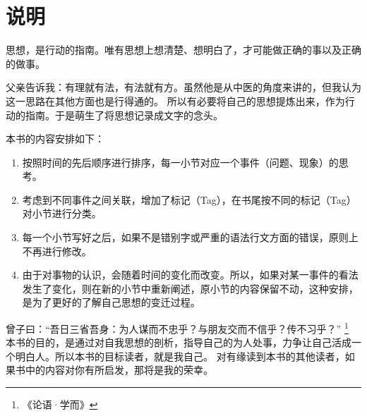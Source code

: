 \chapter{说明}

思想，是行动的指南。唯有思想上想清楚、想明白了，才可能做正确的事以及正确的做事。

父亲告诉我：有理就有法，有法就有方。虽然他是从中医的角度来讲的，但我认为这一思路在其他方面也是行得通的。
所以有必要将自己的思想提炼出来，作为行动的指南。于是萌生了将思想记录成文字的念头。

本书的内容安排如下：

\begin{enumerate}[(1), nosep, left=\parindent]
    \item 按照时间的先后顺序进行排序，每一小节对应一个事件（问题、现象）的思考。

    \item 考虑到不同事件之间关联，增加了标记（Tag），在书尾按不同的标记（Tag）对小节进行分类。

    \item 每一个小节写好之后，如果不是错别字或严重的语法行文方面的错误，原则上不再进行修改。

    \item 由于对事物的认识，会随着时间的变化而改变。所以，如果对某一事件的看法发生了变化，则在新的小节中重新阐述，原小节的内容保留不动，这种安排，是为了更好的了解自己思想的变迁过程。
\end{enumerate}

曾子曰：“吾日三省吾身：为人谋而不忠乎？与朋友交而不信乎？传不习乎？” \footnote{《论语·学而》}
本书的目的，是通过对自我思想的剖析，指导自己的为人处事，力争让自己活成一个明白人。所以本书的目标读者，就是我自己。
对有缘读到本书的其他读者，如果书中的内容对你有所启发，那将是我的荣幸。
